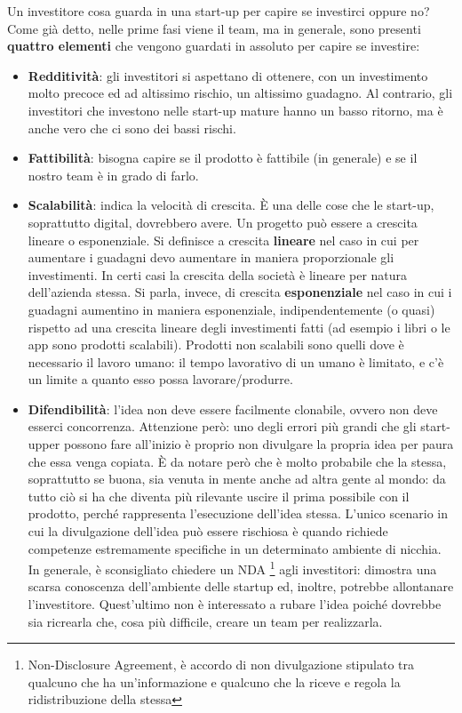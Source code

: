 Un investitore cosa guarda in una start-up per capire se investirci oppure no?
Come già detto, nelle prime fasi viene il team, ma in generale, sono presenti
\textbf{quattro elementi} che vengono guardati in assoluto per capire se
investire:
\begin{itemize}
 \item \textbf{Redditività}: gli investitori si aspettano di ottenere, con un
 investimento molto precoce ed ad altissimo rischio, un altissimo guadagno. Al
 contrario, gli investitori che investono nelle start-up mature hanno un basso
 ritorno, ma è anche vero che ci sono dei bassi rischi.
 \item \textbf{Fattibilità}: bisogna capire se il prodotto è fattibile (in
 generale) e se il nostro team è in grado di farlo.
 \item \textbf{Scalabilità}: indica la velocità di crescita. È una delle cose
 che le start-up, soprattutto digital, dovrebbero avere. Un progetto può essere
 a crescita lineare o esponenziale. Si definisce a crescita \textbf{lineare}
 nel caso in cui per aumentare i guadagni devo aumentare in maniera
 proporzionale gli investimenti. In certi casi la crescita della società è
 lineare per natura dell'azienda stessa. Si parla, invece, di crescita
 \textbf{esponenziale} nel caso in cui i guadagni aumentino in maniera
 esponenziale, indipendentemente (o quasi) rispetto ad una crescita lineare
 degli investimenti fatti (ad esempio i libri o le app sono prodotti scalabili).
 Prodotti non scalabili sono quelli dove è necessario il lavoro umano: il tempo
 lavorativo di un umano è limitato, e c'è un limite a quanto esso possa
 lavorare/produrre.
 \item \textbf{Difendibilità}: l'idea non deve essere facilmente clonabile,
 ovvero non deve esserci concorrenza. Attenzione però: uno degli errori più
 grandi che gli start-upper possono fare all'inizio è proprio non divulgare la
 propria idea per paura che essa venga copiata. È da notare però che è molto
 probabile che la stessa, soprattutto se buona, sia venuta in mente anche
 ad altra gente al mondo: da tutto ciò si ha che diventa più rilevante uscire
 il  prima possibile con  il prodotto, perché rappresenta l'esecuzione
 dell'idea  stessa. L'unico  scenario in cui la divulgazione dell'idea può
 essere  rischiosa è quando richiede competenze  estremamente specifiche in un
 determinato ambiente di nicchia. In generale,  è sconsigliato chiedere un NDA
 \footnote{Non-Disclosure Agreement, è accordo di non divulgazione stipulato
 tra qualcuno che ha un'informazione e qualcuno che la riceve e regola la
 ridistribuzione della stessa} agli investitori: dimostra una scarsa conoscenza
 dell'ambiente delle startup ed, inoltre, potrebbe allontanare l'investitore.
 Quest'ultimo non è interessato a rubare l'idea poiché dovrebbe sia ricrearla
 che, cosa più difficile, creare un team per realizzarla.


\end{itemize}
